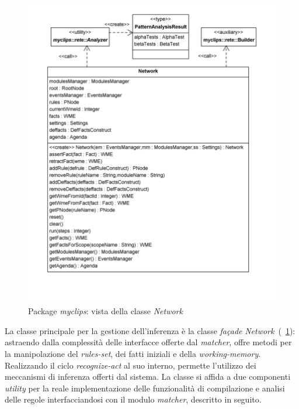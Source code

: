 \begin{figure}
\centering
\includegraphics[width=1\textwidth]{Immagini/Capitolo3/Classi/myclips_rete_Network.png}
\caption{Package \emph{myclips}: vista della classe \emph{Network}}\label{fig:class-myclips-network}
\end{figure}

La classe principale per la gestione dell'inferenza è la classe \emph{fa\c{c}ade} \emph{Network}~(\figurename~\ref{fig:class-myclips-network}): astraendo dalla complessità delle interfacce offerte dal \emph{matcher}, offre metodi per la manipolazione del \emph{rules-set}, dei fatti iniziali e della \emph{working-memory}. Realizzando il ciclo \emph{recognize-act} al suo interno, permette l'utilizzo dei meccanismi di inferenza offerti dal sistema. La classe si affida a due componenti \emph{utility} per la reale implementazione delle funzionalità di compilazione e analisi delle regole interfacciandosi con il modulo \emph{matcher}, descritto in seguito.


